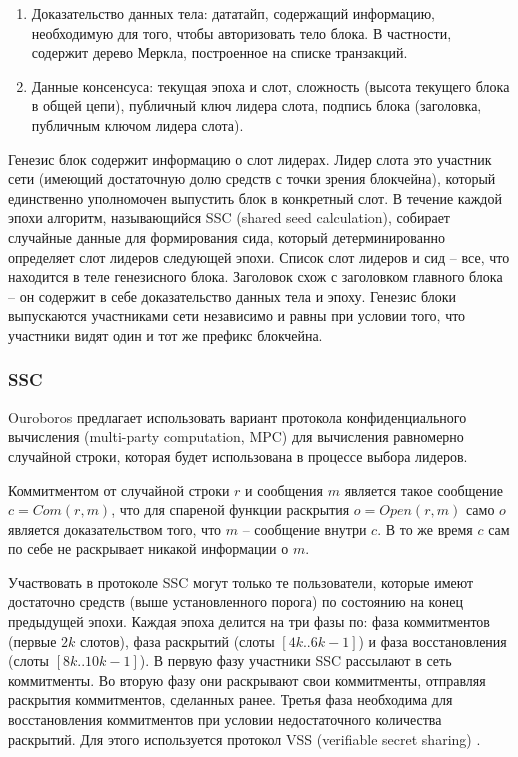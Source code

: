 \documentclass[specification,annotation]{itmo-student-thesis}
\begin{document}
\begin{enumerate}
\item Доказательство данных тела: дататайп, содержащий информацию,
  необходимую для того, чтобы авторизовать тело блока. В частности,
  содержит дерево Меркла, построенное на списке транзакций.
\item Данные консенсуса: текущая эпоха и слот, сложность (высота
  текущего блока в общей цепи), публичный ключ лидера слота, подпись
  блока (заголовка, публичным ключом лидера слота).
\end{enumerate}

Генезис блок содержит информацию о слот лидерах. Лидер слота это
участник сети (имеющий достаточную долю средств с точки зрения
блокчейна), который единственно уполномочен выпустить блок в
конкретный слот. В течение каждой эпохи алгоритм, называющийся SSC
(shared seed calculation), собирает случайные данные для формирования
сида, который детерминированно определяет слот лидеров следующей
эпохи. Список слот лидеров и сид -- все, что находится в теле
генезисного блока. Заголовок схож с заголовком главного блока -- он
содержит в себе доказательство данных тела и эпоху. Генезис блоки
выпускаются участниками сети независимо и равны при условии того, что
участники видят один и тот же префикс блокчейна.

\subsubsection{SSC}

Ouroboros предлагает использовать вариант протокола конфиденциального
вычисления (multi-party computation, MPC) для вычисления равномерно
случайной строки, которая будет использована в процессе выбора
лидеров.

Коммитментом от случайной строки $r$ и сообщения $m$ является такое
сообщение $c = Com(r,m)$, что для спареной функции раскрытия $o =
Open(r,m)$ само $o$ является доказательством того, что $m$ --
сообщение внутри $c$. В то же время $c$ сам по себе не раскрывает
никакой информации о $m$.

Участвовать в протоколе SSC могут только те пользователи, которые
имеют достаточно средств (выше установленного порога) по состоянию на
конец предыдущей эпохи. Каждая эпоха делится на три фазы по: фаза
коммитментов (первые $2k$ слотов), фаза раскрытий (слоты $[4k..6k-1]$)
и фаза восстановления (слоты $[8k..10k-1]$). В первую фазу участники
SSC рассылают в сеть коммитменты. Во вторую фазу они раскрывают свои
коммитменты, отправляя раскрытия коммитментов, сделанных ранее. Третья
фаза необходима для восстановления коммитментов при условии
недостаточного количества раскрытий. Для этого используется протокол
VSS (verifiable secret sharing) \cite{feldman1987practical}.
\end{document}

